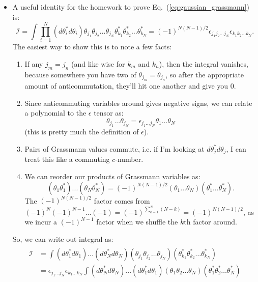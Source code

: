 \documentclass[12pt, oneside]{article}   	%
\theoremstyle{definition}
\begin{document}
\begin{itemize}
	\item A useful identity for the homework to prove Eq.~(\ref{eq:gaussian_grassmann}) is: 
	\begin{equation}
		\mathcal I = \int \prod_{i=1}^N (d\theta_i^* d\theta_i) \theta_{j_1}\theta_{j_2}\dots \theta_{j_N}\theta^*_{k_1}\theta^*_{k_2}\dots \theta^*_{k_N}
= (-1)^{N(N - 1) / 2} \epsilon_{j_1 j_2\dots j_N}\epsilon_{k_1 k_2\dots k_N}. \label{eq:integral_for_proof}
	\end{equation}
	The easiest way to show this is to note a few facts:
	\begin{enumerate}
		\item If any $j_m = j_n$ (and like wise for $k_m$ and $k_n$), then the integral vanishes, because somewhere you have two of $\theta_{j_m} = \theta_{j_n}$, so after the appropriate amount of anticommutation, they'll hit one another and give you $0$. 
		\item Since anticommuting variables around gives negative signs, we can relate a polynomial to the $\epsilon$ tensor as:
	\begin{equation}
		\theta_{j_1} ... \theta_{j_N} = \epsilon_{j_1 ... j_N} \theta_1 ... \theta_N
	\end{equation}
	(this is pretty much the definition of $\epsilon$). 
		\item Pairs of Grassmann values commute, i.e. if I'm looking at $d\theta_j^* d\theta_j$, I can treat this like a commuting $c$-number.
		\item We can reorder our products of Grassmann variables as:
		\begin{equation}
			(\theta_1 \theta_1^*) ... (\theta_N \theta_N^*) = (-1)^{N(N - 1) / 2} (\theta_1 ... \theta_N) (\theta_1^* ... \theta_N^*). 
		\end{equation}
		The $(-1)^{N(N - 1) / 2}$ factor comes from $(-1)^N(-1)^{N - 1} ... (-1) = (-1)^{\sum_{k = 1}^N (N - k)} = (-1)^{N(N - 1) / 2}$, as we incur a $(-1)^{N - 1}$ factor when we shuffle the $k$th factor around. 
	\end{enumerate}
	So, we can write out integral as:
	\begin{align}\begin{split}
		\mathcal I &= \int (d\theta_1^* d\theta_1) ... (d\theta_N^* d\theta_N) (\theta_{j_1}\theta_{j_2}\dots \theta_{j_N})(\theta^*_{k_1}\theta^*_{k_2}\dots \theta^*_{k_N}) \\
		&= \epsilon_{j_1 ... j_N} \epsilon_{k_1 ... k_N} \int (d\theta_N^* d\theta_N) ... (d\theta_1^* d\theta_1) (\theta_{1}\theta_{2}\dots \theta_{N})(\theta^*_{1}\theta^*_{2}\dots \theta^*_{N}) \\

\end{split}
\end{align}
\end{itemize}
\end{document}
